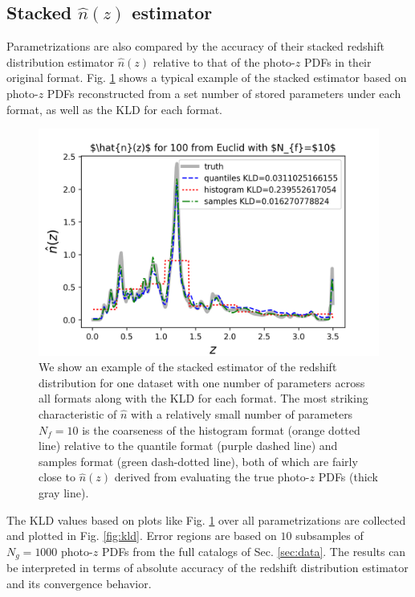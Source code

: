 \documentclass[\docopts]{\docclass}
\newcommand{\pz}{photo-$z$ PDF}
\begin{document}
\subsection{Stacked $\hat{n}(z)$ estimator}
\label{sec:stacked}

Parametrizations are also compared by the accuracy of their stacked redshift 
distribution estimator $\hat{n}(z)$ relative to that of the \pz s in their 
original format.  Fig. \ref{fig:stacked} shows a typical example of the stacked 
estimator based on \pz s reconstructed from a set number of stored parameters 
under each format, as well as the KLD for each format.

\begin{figure}
  
\includegraphics[width=0.9\columnwidth]{figures/euclid_stacked_placeholder.png}
  \caption{We show an example of the stacked estimator of the redshift 
distribution for one dataset with one number of parameters across all formats 
along with the KLD for each format.  The most striking characteristic of 
$\hat{n}$ with a relatively small number of parameters $N_{f}=10$ is the 
coarseness of the histogram format (orange dotted line) relative to the 
quantile format (purple dashed line) and samples format (green dash-dotted 
line), both of which are fairly close to $\hat{n}(z)$ derived from evaluating 
the true \pz s (thick gray line).
  \label{fig:stacked}}
\end{figure}

The KLD values based on plots like Fig. \ref{fig:stacked} over all 
parametrizations are collected and plotted in Fig. \ref{fig:kld}.  Error 
regions are based on $10$ subsamples of $N_{g}=1000$ \pz s from the full 
catalogs of Sec. \ref{sec:data}.  The results can be interpreted in terms of 
absolute accuracy of the redshift distribution estimator and its convergence 
behavior.
\end{document}
